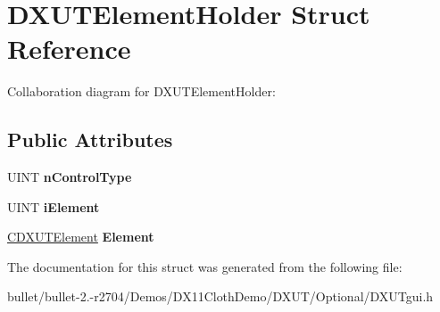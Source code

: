 \hypertarget{struct_d_x_u_t_element_holder}{\section{D\+X\+U\+T\+Element\+Holder Struct Reference}
\label{struct_d_x_u_t_element_holder}
}


Collaboration diagram for D\+X\+U\+T\+Element\+Holder\+:
\subsection*{Public Attributes}
\begin{DoxyCompactItemize}
\item 
\hypertarget{struct_d_x_u_t_element_holder_ae2a3a39c164131b44d6db44802364dad}{U\+I\+N\+T {\bfseries n\+Control\+Type}}\label{struct_d_x_u_t_element_holder_ae2a3a39c164131b44d6db44802364dad}

\item 
\hypertarget{struct_d_x_u_t_element_holder_ac66b78134099b50e4530e511f853c1e2}{U\+I\+N\+T {\bfseries i\+Element}}\label{struct_d_x_u_t_element_holder_ac66b78134099b50e4530e511f853c1e2}

\item 
\hypertarget{struct_d_x_u_t_element_holder_adcd7b3a9ece5b1f3843a98b6b01fff82}{\hyperlink{class_c_d_x_u_t_element}{C\+D\+X\+U\+T\+Element} {\bfseries Element}}\label{struct_d_x_u_t_element_holder_adcd7b3a9ece5b1f3843a98b6b01fff82}

\end{DoxyCompactItemize}


The documentation for this struct was generated from the following file\+:\begin{DoxyCompactItemize}
\item 
bullet/bullet-\/2.-\/r2704/\+Demos/\+D\+X11\+Cloth\+Demo/\+D\+X\+U\+T/\+Optional/D\+X\+U\+Tgui.\+h\end{DoxyCompactItemize}
